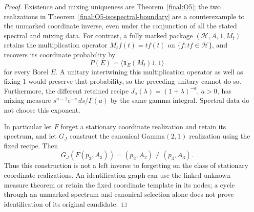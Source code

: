 \begin{proof}
Existence and mixing uniqueness are Theorem~\ref{final:O5}; the two
realizations in Theorem~\ref{final:O5-isospectral-boundary} are a
counterexample to the unmarked coordinate inverse, even under the
conjunction of all the stated spectral and mixing data.
For contrast, a fully marked package
$(\mathcal H,A,1,M_t)$ retains the multiplication operator
$M_tf(t)=tf(t)$ on $\{f:tf\in\mathcal H\}$, and recovers its
coordinate probability by
\[
 P(E)=\langle\mathbf1_E(M_t)1,1\rangle
\]
for every Borel $E$.  A unitary intertwining this multiplication
operator as well as fixing $1$ would preserve that probability,
so the preceding unitary cannot do so.
Furthermore, the different retained recipe
$J_a(\lambda)=(1+\lambda)^{-a}$, $a>0$, has mixing measure
$s^{a-1}e^{-s}\,ds/\Gamma(a)$ by the same gamma integral.
Spectral data do not choose this exponent.

In particular let $F$ forget a stationary coordinate realization
and retain its spectrum, and let $G_J$ construct the canonical
Gamma$(2,1)$ realization using the fixed recipe.  Then
\[
 G_J(F(p_3,A_3))=(p_2,A_2)\ne(p_3,A_3).
\]
Thus this construction is not a left inverse to forgetting on the
class of stationary coordinate realizations.  An identification
graph can use the linked unknown-measure theorem or retain the
fixed coordinate template in its nodes; a cycle through an
unmarked spectrum and canonical selection alone does not prove
identification of its original candidate.
\end{proof}
